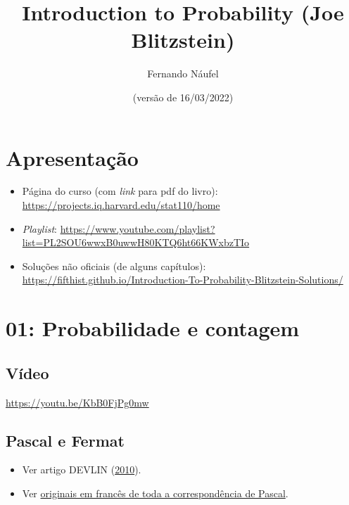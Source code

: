 \documentclass[
  11pt]{report}
\title{Introduction to Probability (Joe Blitzstein)}
\author{Fernando Náufel}
\date{(versão de 16/03/2022)}
\begin{document}
\maketitle

{
\setcounter{tocdepth}{1}
\tableofcontents
}
\hypertarget{apresentauxe7uxe3o}{%
\chapter*{Apresentação}\label{apresentauxe7uxe3o}}

\begin{itemize}
\item
  Página do curso (com \emph{link} para pdf do livro): \url{https://projects.iq.harvard.edu/stat110/home}
\item
  \emph{Playlist}: \url{https://www.youtube.com/playlist?list=PL2SOU6wwxB0uwwH80KTQ6ht66KWxbzTIo}
\item
  Soluções não oficiais (de alguns capítulos): \url{https://fifthist.github.io/Introduction-To-Probability-Blitzstein-Solutions/}
\end{itemize}

\hypertarget{probabilidade-e-contagem}{%
\chapter*{01: Probabilidade e contagem}\label{probabilidade-e-contagem}}

\hypertarget{vuxeddeo}{%
\section*{Vídeo}\label{vuxeddeo}}

\begin{center} \url{https://youtu.be/KbB0FjPg0mw} \end{center}

\hypertarget{pascal-e-fermat}{%
\section*{Pascal e Fermat}\label{pascal-e-fermat}}

\begin{itemize}
\item
  Ver artigo DEVLIN (\protect\hyperlink{ref-devlin-2010-pascal-fermat}{2010}).
\item
  Ver \href{https://gallica.bnf.fr/ark:/12148/bpt6k69975r.image.r=Blaise+Pascal.f233.langFR}{originais em francês de toda a correspondência de Pascal}.
\end{itemize}
\end{document}
